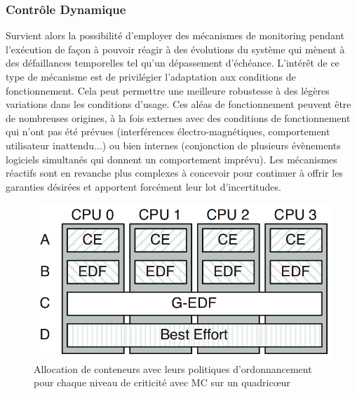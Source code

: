 \documentclass[french, a4paper, 11pt, twoside, pdftex]{StyleThese}
\begin{document}
    
	\subsubsection{Contrôle Dynamique}
    
     Survient alors la possibilité d'employer des mécanismes de monitoring pendant l'exécution de façon à pouvoir réagir à des évolutions du système qui mènent à des défaillances temporelles tel qu'un dépassement d'échéance. L'intérêt de ce type de mécanisme est de privilégier l'adaptation aux conditions de fonctionnement. Cela peut permettre une meilleure robustesse à des légères variations dans les conditions d'usage. Ces aléas de fonctionnement peuvent être de nombreuses origines, à la fois externes avec des conditions de fonctionnement qui n'ont pas été prévues (interférences électro-magnétiques, comportement utilisateur inattendu...) ou bien internes (conjonction de plusieurs évènements logiciels simultanés qui donnent un comportement imprévu). Les mécanismes réactifs sont en revanche plus complexes à concevoir pour continuer à offrir les garanties désirées et apportent forcément leur lot d'incertitudes. 
     
     \begin{figure}[ht]
     	\centering
     	\includegraphics[width=0.7\linewidth]{schemas/MC2_scheduling_model}
     	\captionsetup{justification=centering} \caption{Allocation de conteneurs avec leurs politiques d'ordonnancement pour chaque niveau de criticité avec MC sur un quadricœur~\cite{herman_rtos_2012}}
     	\label{fig:mc2schedulingmodel}
     \end{figure}
 
\end{document}
